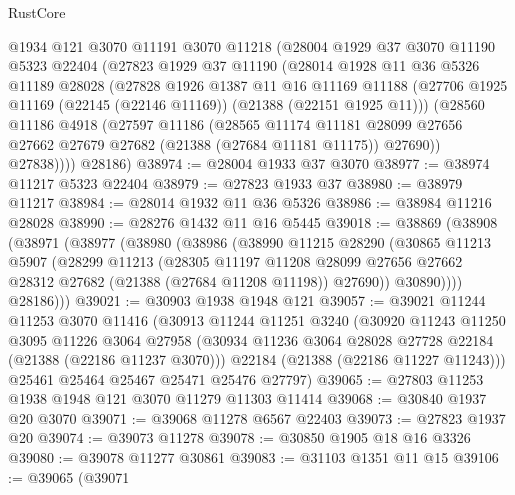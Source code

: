 \begin{lexlean}{RustCore}
\begin{coremodule}
    @1934
    @121
    @3070
    @11191
    @3070
    @11218
    (@28004
      @1929
      @37
      @3070
      @11190
      @5323
      @22404
      (@27823
        @1929
        @37
        @11190
        (@28014
          @1928
          @11
          @36
          @5326
          @11189
          @28028
          (@27828
            @1926
            @1387
            @11
            @16
            @11169
            @11188
            (@27706 @1925 @11169 (@22145 (@22146 @11169)) (@21388 (@22151 @1925 @11)))
            (@28560
              @11186
              @4918
              (@27597
                @11186
                (@28565
                  @11174
                  @11181
                  @28099
                  @27656
                  @27662
                  @27679
                  @27682
                  (@21388 (@27684 @11181 @11175))
                  @27690))
              @27838))))
      @28186)
@38974 := @28004 @1933 @37 @3070
@38977 := @38974 @11217 @5323 @22404
@38979 := @27823 @1933 @37
@38980 := @38979 @11217
@38984 := @28014 @1932 @11 @36 @5326
@38986 := @38984 @11216 @28028
@38990 := @28276 @1432 @11 @16 @5445
@39018 := @38869
    (@38908
      (@38971
        (@38977
          (@38980
            (@38986
              (@38990
                @11215
                @28290
                (@30865
                  @11213
                  @5907
                  (@28299
                    @11213
                    (@28305
                      @11197
                      @11208
                      @28099
                      @27656
                      @27662
                      @28312
                      @27682
                      (@21388 (@27684 @11208 @11198))
                      @27690))
                  @30890))))
          @28186)))
@39021 := @30903 @1938 @1948 @121
@39057 := @39021
    @11244
    @11253
    @3070
    @11416
    (@30913
      @11244
      @11251
      @3240
      (@30920
        @11243
        @11250
        @3095
        @11226
        @3064
        @27958
        (@30934 @11236 @3064 @28028 @27728 @22184 (@21388 (@22186 @11237 @3070)))
        @22184
        (@21388 (@22186 @11227 @11243)))
      @25461
      @25464
      @25467
      @25471
      @25476
      @27797)
@39065 := @27803 @11253 @1938 @1948 @121 @3070 @11279 @11303 @11414
@39068 := @30840 @1937 @20 @3070
@39071 := @39068 @11278 @6567 @22403
@39073 := @27823 @1937 @20
@39074 := @39073 @11278
@39078 := @30850 @1905 @18 @16 @3326
@39080 := @39078 @11277 @30861
@39083 := @31103 @1351 @11 @15
@39106 := @39065
    (@39071

\end{coremodule}
\end{lexlean}
